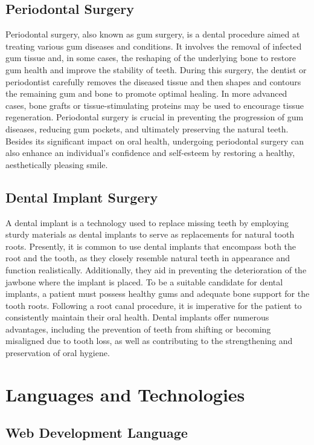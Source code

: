 \documentclass[12pt,oneside,openright,a4paper]{cpe-english-project}
\begin{document}
    \subsection{Periodontal Surgery}
      \qquad Periodontal surgery, also known as gum surgery, is a dental procedure aimed at treating various gum diseases and conditions. It involves the removal of infected gum tissue and, in some cases, the reshaping of the underlying bone to restore gum health and improve the stability of teeth. During this surgery, the dentist or periodontist carefully removes the diseased tissue and then shapes and contours the remaining gum and bone to promote optimal healing. In more advanced cases, bone grafts or tissue-stimulating proteins may be used to encourage tissue regeneration. Periodontal surgery is crucial in preventing the progression of gum diseases, reducing gum pockets, and ultimately preserving the natural teeth. Besides its significant impact on oral health, undergoing periodontal surgery can also enhance an individual's confidence and self-esteem by restoring a healthy, aesthetically pleasing smile.\par
  
    \subsection{Dental Implant Surgery}
      \qquad A dental implant is a technology used to replace missing teeth by employing sturdy materials as dental implants to serve as replacements for natural tooth roots. Presently, it is common to use dental implants that encompass both the root and the tooth, as they closely resemble natural teeth in appearance and function realistically. Additionally, they aid in preventing the deterioration of the jawbone where the implant is placed. To be a suitable candidate for dental implants, a patient must possess healthy gums and adequate bone support for the tooth roots. Following a root canal procedure, it is imperative for the patient to consistently maintain their oral health. Dental implants offer numerous advantages, including the prevention of teeth from shifting or becoming misaligned due to tooth loss, as well as contributing to the strengthening and preservation of oral hygiene.\par
  
  \section{Languages and Technologies}
    \subsection{Web Development Language}
\end{document}
